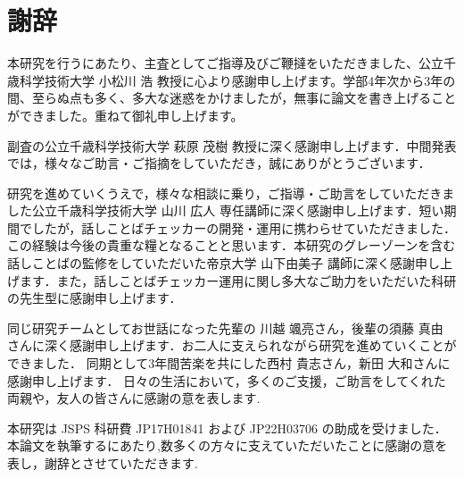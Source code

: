 \chapter*{謝辞}

本研究を行うにあたり、主査としてご指導及びご鞭撻をいただきました、公立千歳科学技術大学 小松川 浩 教授に心より感謝申し上げます。学部4年次から3年の間、至らぬ点も多く、多大な迷惑をかけましたが，無事に論文を書き上げることができました。重ねて御礼申し上げます。

副査の公立千歳科学技術大学 萩原 茂樹 教授に深く感謝申し上げます．中間発表では，様々なご助言・ご指摘をしていただき，誠にありがとうございます．

研究を進めていくうえで，様々な相談に乗り，ご指導・ご助言をしていただきました公立千歳科学技術大学 山川 広人 専任講師に深く感謝申し上げます．短い期間でしたが，話しことばチェッカーの開発・運用に携わらせていただきました．この経験は今後の貴重な糧となることと思います．本研究のグレーゾーンを含む話しことばの監修をしていただいた帝京大学 山下由美子 講師に深く感謝申し上げます．また，話しことばチェッカー運用に関し多大なご助力をいただいた科研の先生型に感謝申し上げます．

同じ研究チームとしてお世話になった先輩の 川越 颯亮さん，後輩の須藤 真由 さんに深く感謝申し上げます．お二人に支えられながら研究を進めていくことができました．
同期として3年間苦楽を共にした西村 貴志さん，新田 大和さんに感謝申し上げます．
日々の生活において，多くのご支援，ご助言をしてくれた両親や，友人の皆さんに感謝の意を表します.

本研究は JSPS 科研費 JP17H01841 および JP22H03706 の助成を受けました．本論文を執筆するにあたり,数多くの方々に支えていただいたことに感謝の意を表し，謝辞とさせていただきます.